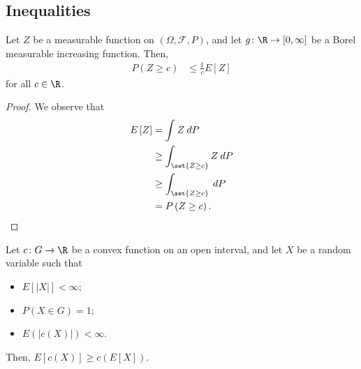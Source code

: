 \documentclass[10pt]{mypackage}
\begin{document}
\subsection{Inequalities}%
\begin{theorem}
  Let $Z$ be a measurable function on $\left( \Omega, \mathcal{F},P \right)$, and let $g\colon \R\to[0,\infty]$ be a Borel measurable increasing function. Then,
  \begin{align*}
    P\left( Z\geq c \right) &\leq \frac{1}{c}E\left[ Z \right]
  \end{align*}
  for all $c\in \R$.
\end{theorem}
\begin{proof}
  We observe that
  \begin{align*}
    E\left[ Z \right] &= \int_{}^{} Z\:dP\\
                      &\geq \int_{\set{Z\geq c}}^{} Z\:dP\\
                      &\geq \int_{\set{Z\geq c}}^{} \:dP\\
                      &= P\left( Z\geq c \right).
  \end{align*}
\end{proof}
\begin{theorem}
  Let $c\colon G\rightarrow \R$ be a convex function on an open interval, and let $X$ be a random variable such that
  \begin{itemize}
    \item $E\left[ \left\vert X \right\vert \right] < \infty$;
    \item $P\left( X\in G \right) = 1$;
    \item $E\left( \left\vert c(X) \right\vert \right) < \infty$.
  \end{itemize}
  Then, $E\left[ c(X) \right]\geq c\left( E\left[ X \right] \right)$.
\end{theorem}
\end{document}
